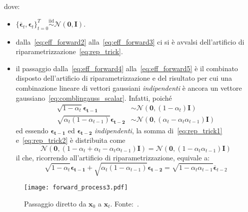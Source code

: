 \noindent dove:
\begin{itemize}
  \item $\{\overline{\bm{\epsilon}}_{t},\bm{\epsilon}_{t}\}_{t=0}^T\overset{\text{iid}}{\sim} \mathcal{N}(\bm{0},\bm{I})$.
  \item dalla~\eqref{eq:eff_forward2} alla~\eqref{eq:eff_forward3} ci si è avvalsi dell'artificio di 
        riparametrizzazione~\eqref{eq:rep_trick}.
  \item il passaggio dalla~\eqref{eq:eff_forward4} alla~\eqref{eq:eff_forward5} è il combinato disposto dell'artificio di riparametrizzazione e 
  del risultato per cui una combinazione lineare di vettori gaussiani 
  \emph{indipendenti} è ancora un vettore gaussiano~\eqref{eq:comblingauss_scalar}. Infatti, poiché
  \begin{align}
    \sqrt{1-\alpha_t}\bm{\epsilon_{t-1}} &\sim \mathcal{N}(\bm{0},(1-\alpha_t)\bm{I}) \label{eq:rep_trick1}\\
    \sqrt{\alpha_t(1-\alpha_{t-1})}\bm{\epsilon_{t-2}} &\sim \mathcal{N}(\bm{0},(\alpha_t-\alpha_t\alpha_{t-1})\bm{I}) \label{eq:rep_trick2}
  \end{align}
  ed essendo $\bm{\epsilon_{t-1}}$ ed $\bm{\epsilon_{t-2}}$ \emph{indipendenti}, la somma di~\eqref{eq:rep_trick1} e~\eqref{eq:rep_trick2} è distribuita come
  \[
    \mathcal{N}(\bm{0},(1-\alpha_t+\alpha_t-\alpha_t\alpha_{t-1})\bm{I})=\mathcal{N}(\bm{0},(1-\alpha_t\alpha_{t-1})\bm{I})
  \]
  il che, ricorrendo all'artificio di riparametrizzazione, equivale a:
  \[
    \sqrt{1-\alpha_t}\bm{\epsilon_{t-1}} + \sqrt{\alpha_t(1-\alpha_{t-1})}\bm{\epsilon_{t-2}}
    =\sqrt{1-\alpha_t\alpha_{t-1}}\overline{\bm{\epsilon}}_{t-2}
  \]
\end{itemize} 

\begin{figure}
  \centering
  \texttt{[image: forward\_process3.pdf]}
  \caption{Passaggio diretto da $\mathbf{x}_0$ a $\mathbf{x}_t$. Fonte:~\cite{vaibhavsinghInDepthGuideDenoising2023}.}
 \label{fig:skip_steps}
\end{figure}

